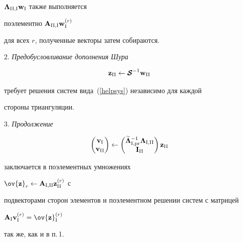 $\boldsymbol {\Lambda}_{{\mathrm{II}},{\mathrm{I}}}{\bold w}_{{\mathrm{I}}}$ также выполняется


поэлементно ${\bold A}_{{\mathrm{II}},{\mathrm{I}}}{\bold w}_{{\mathrm{I}}}^{(r)}$ 


для всех $r$, полученные векторы затем собираются.





2. {\it Предобусловливание дополнения Шура}


$$


{\bold z}_{\rii}\leftarrow \bi{\cal S}^{-1} {\bold w}_{\rii}


$$


требует решения систем вида~(\ref{helpsys}) независимо для каждой


стороны триангуляции.





3. {\it Продолжение}


\begin{equation}


\label{prolong}


\begin{pmatrix}


{\bold v}_\ri \\ {\bold v}_{\rii}


\end{pmatrix}


\leftarrow 


\begin{pmatrix}


\widetilde{\bi\Lambda}{}_{\ri,\mathrm{pr}}^{-1}\bi\Lambda_{\ri,\rii} \\


{\bold I}_{\rii}


\end{pmatrix}


{\bold z}_{\rii}


\end{equation}


заключается в поэлементных умножениях 


$\ov{\bold z}_r\leftarrow{\bold A}_{\ri,\rii}{\bold z}^{(r)}_{\rii}$ с


подвекторами сторон элементов и поэлементном решении систем с матрицей


${\bold A}_\ri {\bold v}_{\ri}^{(r)}=\ov {\bold z}_{\ri}^{(r)}$


так же, как и в п.\,1.





